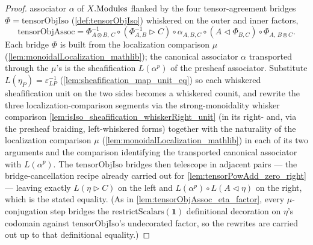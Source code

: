 \begin{proof}
  associator \(\alpha\) of \(X.\mathrm{Modules}\) flanked by the four tensor-agreement
  bridges \(\Phi = \mathrm{tensorObjIso}\) (\cref{def:tensorObjIso}) whiskered on the
  outer and inner factors,
  \[
    \mathrm{tensorObjAssoc} = \Phi^{-1}_{A\otimes B,\,C}
      \circ (\Phi^{-1}_{A,B} \rhd C) \circ \alpha_{A,B,C}
      \circ (A \lhd \Phi_{B,C}) \circ \Phi_{A,\,B\otimes C}.
  \]
  Each bridge \(\Phi\) is built from the localization comparison \(\mu\)
  (\cref{lem:monoidalLocalization_mathlib}); the canonical associator \(\alpha\)
  transported through the \(\mu\)'s is the sheafification \(L(\alpha^{p})\) of the
  presheaf associator. Substitute \(L(\eta_P) = \varepsilon_{LP}^{-1}\)
  (\cref{lem:sheafification_map_unit_eq}) so each whiskered sheafification unit on the
  two sides becomes a whiskered counit, and rewrite the three localization-comparison
  segments via the strong-monoidality whisker comparison
  \cref{lem:isIso_sheafification_whiskerRight_unit} (in its right- and, via the
  presheaf braiding, left-whiskered forms) together with the naturality of the
  localization comparison \(\mu\) (\cref{lem:monoidalLocalization_mathlib}) in each of
  its two arguments and the comparison identifying the transported canonical associator
  with \(L(\alpha^{p})\). The \(\mathrm{tensorObjIso}\) bridges
  then telescope in adjacent pairs --- the bridge-cancellation recipe already carried
  out for \cref{lem:tensorPowAdd_zero_right} --- leaving exactly
  \(L(\eta \rhd C)\) on the left and \(L(\alpha^{p}) \circ L(A \lhd \eta)\) on the
  right, which is the stated equality. (As in \cref{lem:tensorObjAssoc_eta_factor},
  every \(\mu\)-conjugation step bridges the
  \(\mathrm{restrictScalars}(\mathbf{1})\) definitional decoration on \(\eta\)'s
  codomain against \(\mathrm{tensorObjIso}\)'s undecorated factor, so the rewrites are
  carried out up to that definitional equality.)
\end{proof}

